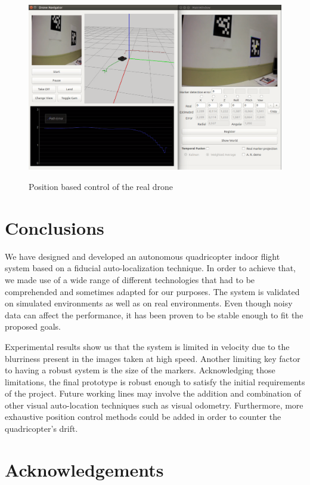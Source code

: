 \documentclass{styles/svproc}
\begin{document}
	\begin{figure}[h]
		\begin{center}
		{\includegraphics[width=12cm]{appcapture.png}}
		\end{center}
		\caption{Position based control of the real drone}
	\end{figure}


\section{Conclusions}

	We have designed and developed an autonomous quadricopter indoor flight system based on a fiducial auto-localization technique. In order to achieve that, we made use of a wide range of different technologies that had to be comprehended and sometimes adapted for our purposes. The system is validated on simulated environments as well as on real environments. Even though noisy data can affect the performance, it has been proven to be stable enough to fit the proposed goals.
	
	Experimental results show us that the system is limited in velocity due to the blurriness present in the images taken at high speed. Another limiting key factor to having a robust system is the size of the markers. Acknowledging those limitations, the final prototype is robust enough to satisfy the initial requirements of the project. Future working lines may involve the addition and combination of other visual auto-location techniques such as visual odometry. Furthermore, more exhaustive position control methods could be added in order to counter the quadricopter's drift.


        \section*{Acknowledgements}
\end{document}
